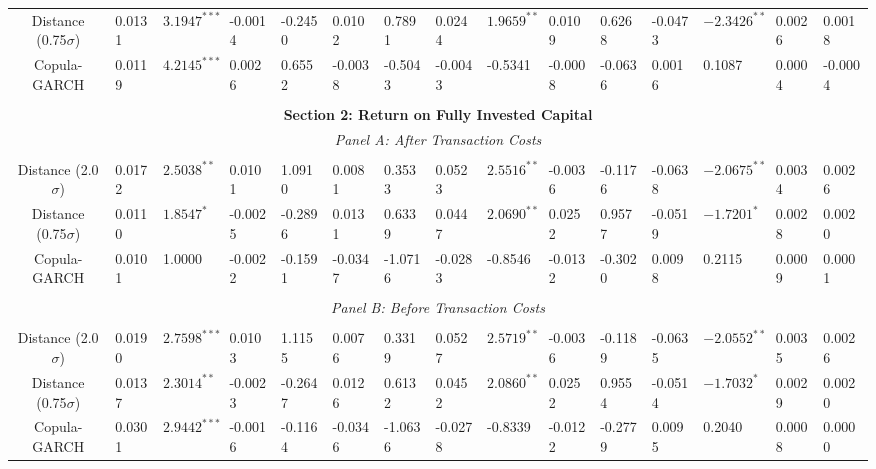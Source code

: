 \documentclass[a4paper]{article}
\begin{document}
\begin{sidewaystable}
\begin{threeparttable}[H]
\begin{tabularx}{\textwidth}{@{\extracolsep{\fill}}lllllllllllllll@{}}
			\multicolumn{1}{c}{Distance (0.75$\sigma$)} & 0.0131 & $3.1947^{***}$ & -0.0014 & -0.2450 & 0.0102 & 0.7891 & 0.0244 & $1.9659^{**}$ & 0.0109 & 0.6268 & -0.0473 & $-2.3426^{**}$ & 0.0026 & 0.0018 \\
			\multicolumn{1}{c}{Copula-GARCH} & 0.0119 & $4.2145^{***}$ & 0.0026 & 0.6552 & -0.0038 & -0.5043 & -0.0043 & -0.5341 & -0.0008 & -0.0636 & 0.0016 & 0.1087 & 0.0004 & -0.0004 \\
			&       &       &       &       &       &       &       &       &       &       &       &       &       &  \\
			\midrule
			\multicolumn{15}{c}{\textbf{Section 2: Return on Fully Invested Capital}} \\
			\multicolumn{15}{c}{\textit{Panel A: After Transaction Costs}} \\
			&       &       &       &       &       &       &       &       &       &       &       &       &       &  \\
			\multicolumn{1}{c}{Distance (2.0$\sigma$)} & 0.0172 & $2.5038^{**}$ & 0.0101 & 1.0910 & 0.0081 & 0.3533 & 0.0523 & $2.5516^{**}$ & -0.0036 & -0.1176 & -0.0638 & $-2.0675^{**}$ & 0.0034 & 0.0026 \\
			\multicolumn{1}{c}{Distance (0.75$\sigma$)} & 0.0110 & $1.8547^{*}$ & -0.0025 & -0.2896 & 0.0131 & 0.6339 & 0.0447 & $2.0690^{**}$ & 0.0252 & 0.9577 & -0.0519 & $-1.7201^{*}$ & 0.0028 & 0.0020 \\
			\multicolumn{1}{c}{Copula-GARCH} & 0.0101 & 1.0000 & -0.0022 & -0.1591 & -0.0347 & -1.0716 & -0.0283 & -0.8546 & -0.0132 & -0.3020 & 0.0098 & 0.2115 & 0.0009 & 0.0001 \\
			&       &       &       &       &       &       &       &       &       &       &       &       &       &  \\
			\multicolumn{15}{c}{\textit{Panel B: Before Transaction Costs}} \\
			&       &       &       &       &       &       &       &       &       &       &       &       &       &  \\
			\multicolumn{1}{c}{Distance (2.0$\sigma$)} & 0.0190 & $2.7598^{***}$ & 0.0103 & 1.1155 & 0.0076 & 0.3319 & 0.0527 & $2.5719^{**}$ & -0.0036 & -0.1189 & -0.0635 & $-2.0552^{**}$ & 0.0035 & 0.0026 \\
			\multicolumn{1}{c}{Distance (0.75$\sigma$)} & 0.0137 & $2.3014^{**}$ & -0.0023 & -0.2647 & 0.0126 & 0.6132 & 0.0452 & $2.0860^{**}$ & 0.0252 & 0.9554 & -0.0514 & $-1.7032^{*}$ & 0.0029 & 0.0020 \\
			\multicolumn{1}{c}{Copula-GARCH} & 0.0301 & $2.9442^{***}$ & -0.0016 & -0.1164 & -0.0346 & -1.0636 & -0.0278 & -0.8339 & -0.0122 & -0.2779 & 0.0095 & 0.2040 & 0.0008 & 0.0000 \\

\end{tabularx}
\end{threeparttable}
\end{sidewaystable}
\end{document}
